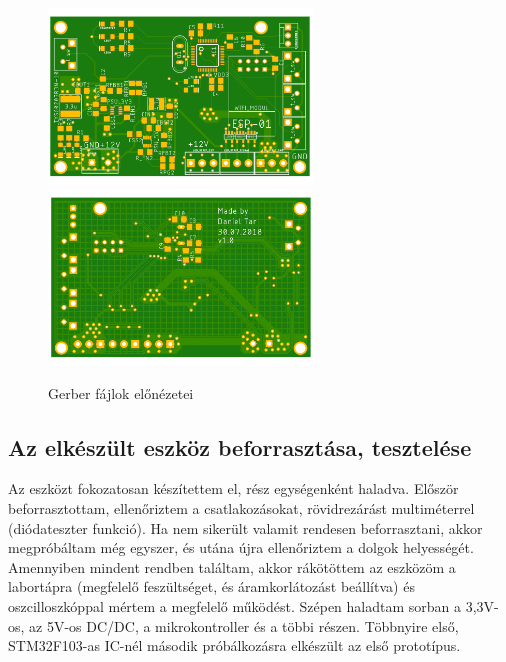 \documentclass[../main.tex]{subfiles}
\begin{document}
            \begin{figure}[h!]
                \centering
                    \includegraphics[width=7cm]{resources/pcb_res/pcb_top_v10.png}
                    \includegraphics[width=7cm]{resources/pcb_res/pcb_bottom_v10.png}
                \caption{Gerber fájlok előnézetei}
                \label{fig:gerber_v10}
            \end{figure}

    \subsection{Az elkészült eszköz beforrasztása, tesztelése}
        Az eszközt fokozatosan készítettem el, rész egységenként haladva. Először beforrasztottam, ellenőriztem a csatlakozásokat, rövidrezárást multiméterrel (diódateszter funkció). Ha nem sikerült valamit rendesen beforrasztani, akkor megpróbáltam még egyszer, és utána újra ellenőriztem a dolgok helyességét. Amennyiben mindent rendben találtam, akkor rákötöttem az eszközöm a labortápra (megfelelő feszültséget, és áramkorlátozást beállítva) és oszcilloszkóppal mértem a megfelelő működést. Szépen haladtam sorban a 3,3V-os, az 5V-os DC/DC, a mikrokontroller és a többi részen. Többnyire első, STM32F103-as IC-nél második próbálkozásra elkészült az első prototípus. 
        
\end{document}
